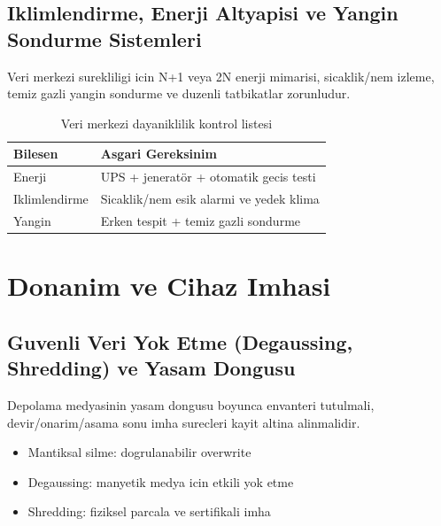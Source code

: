 \subsection{Iklimlendirme, Enerji Altyapisi ve Yangin Sondurme Sistemleri}
Veri merkezi surekliligi icin N+1 veya 2N enerji mimarisi, sicaklik/nem izleme, temiz gazli yangin sondurme ve duzenli tatbikatlar zorunludur.
\begin{table}[htbp]
\centering
\caption{Veri merkezi dayaniklilik kontrol listesi}
\begin{tabular}{|p{4cm}|p{8cm}|}
\hline
\textbf{Bilesen} & \textbf{Asgari Gereksinim} \\
\hline
Enerji & UPS + jeneratör + otomatik gecis testi \\
\hline
Iklimlendirme & Sicaklik/nem esik alarmi ve yedek klima \\
\hline
Yangin & Erken tespit + temiz gazli sondurme \\
\hline
\end{tabular}
\end{table}

\section{Donanim ve Cihaz Imhasi}
\subsection{Guvenli Veri Yok Etme (Degaussing, Shredding) ve Yasam Dongusu}
Depolama medyasinin yasam dongusu boyunca envanteri tutulmali, devir/onarim/asama sonu imha surecleri kayit altina alinmalidir.
\begin{itemize}
    \item Mantiksal silme: dogrulanabilir overwrite
    \item Degaussing: manyetik medya icin etkili yok etme
    \item Shredding: fiziksel parcala ve sertifikali imha
\end{itemize}

